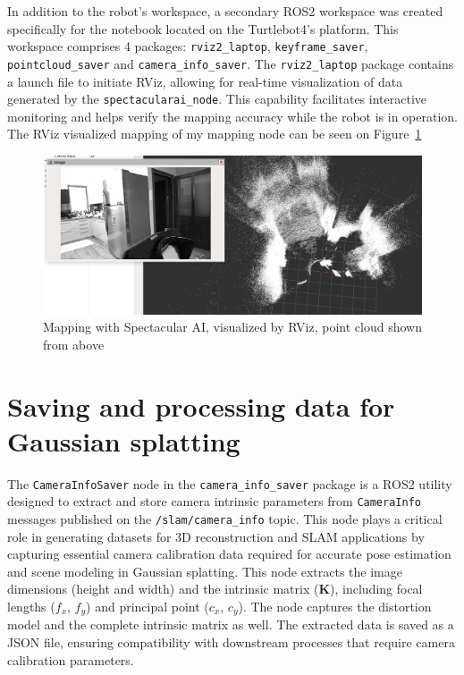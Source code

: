 In addition to the robot’s workspace, a secondary ROS2 workspace was created specifically for the notebook located on the Turtlebot4’s platform. This workspace comprises 4 packages: \verb|rviz2_laptop|, \verb|keyframe_saver|, \verb|pointcloud_saver| and \verb|camera_info_saver|. The \verb|rviz2_laptop| package contains a launch file to initiate RViz, allowing for real-time visualization of data generated by the \verb|spectacularai_node|. This capability facilitates interactive monitoring and helps verify the mapping accuracy while the robot is in operation. The RViz visualized mapping of my mapping node can be seen on Figure~\ref{fig:spai_mapping_rviz}

\begin{figure}[htbp]
	\centering
	\includegraphics[width=150mm, keepaspectratio]{figures_jpg/spai_mapping_rviz.jpg}
	\caption{Mapping with Spectacular AI, visualized by RViz, point cloud shown from above}
	\label{fig:spai_mapping_rviz}
\end{figure}

\FloatBarrier
\section{Saving and processing data for Gaussian splatting}

The \verb|CameraInfoSaver| node in the \verb|camera_info_saver| package is a ROS2 utility designed to extract and store camera intrinsic parameters from \verb|CameraInfo| messages published on the \verb|/slam/camera_info| topic. This node plays a critical role in generating datasets for 3D reconstruction and SLAM applications by capturing essential camera calibration data required for accurate pose estimation and scene modeling in Gaussian splatting. This node extracts the image dimensions (height and width) and the intrinsic matrix (\textbf{K}), including focal lengths ($f_x$, $f_y$) and principal point ($c_x$, $c_y$). The node captures the distortion model and the complete intrinsic matrix as well. The extracted data is saved as a JSON file, ensuring compatibility with downstream processes that require camera calibration parameters.

